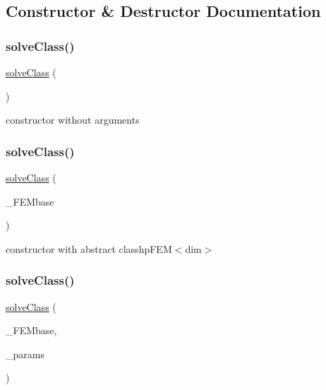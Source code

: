 \subsection{Constructor \& Destructor Documentation}
\mbox{\label{classsolve_class_ac210b30d39cb640ec4d65b667467583d}} 
\subsubsection{\texorpdfstring{solve\+Class()}{solveClass()}\hspace{0.1cm}{\footnotesize\ttfamily [1/3]}}
{\footnotesize\ttfamily \mbox{\hyperlink{classsolve_class}{solve\+Class}} (\begin{DoxyParamCaption}{ }\end{DoxyParamCaption})}

constructor without arguments \mbox{\label{classsolve_class_ada67813836ea60d10b21940008f37585}} 
\subsubsection{\texorpdfstring{solve\+Class()}{solveClass()}\hspace{0.1cm}{\footnotesize\ttfamily [2/3]}}
{\footnotesize\ttfamily \mbox{\hyperlink{classsolve_class}{solve\+Class}} (\begin{DoxyParamCaption}\item[{\mbox{\hyperlink{classhp_f_e_m}{hp\+F\+EM}}$<$ dim $>$ \&}]{\+\_\+\+F\+E\+Mbase }\end{DoxyParamCaption})}

constructor with abstract classhp\+F\+E\+M$<$dim$>$ \mbox{\label{classsolve_class_a50fb5916f24e3b239ff60602c31cc536}} 
\subsubsection{\texorpdfstring{solve\+Class()}{solveClass()}\hspace{0.1cm}{\footnotesize\ttfamily [3/3]}}
{\footnotesize\ttfamily \mbox{\hyperlink{classsolve_class}{solve\+Class}} (\begin{DoxyParamCaption}\item[{\mbox{\hyperlink{classhp_f_e_m}{hp\+F\+EM}}$<$ dim $>$ \&}]{\+\_\+\+F\+E\+Mbase,  }\item[{dealii\+::\+Parameter\+Handler \&}]{\+\_\+params }\end{DoxyParamCaption})}

